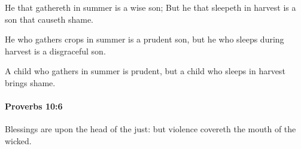			\begin{versebox}
					\item[BHS] 
					\item[ASV] He that gathereth in summer is a wise son; But he that sleepeth in harvest is a son that causeth shame.
					\item[NIV] He who gathers crops in summer is a prudent son, but he who sleeps during harvest is a disgraceful son.
					\item[NRSV] A child who gathers in summer is prudent, but a child who sleeps in harvest brings shame.
			\end{versebox}

		\paragraph{Proverbs 10:6} %
			\label{PROVERBS-10-6}

			Blessings are upon the head of the just: but violence covereth the mouth of the wicked.

